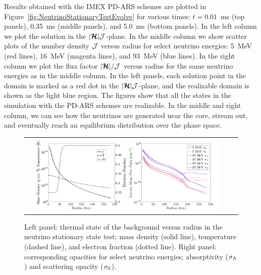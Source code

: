 Results obtained with the IMEX PD-ARS schemes are plotted in Figure~\ref{fig:NeutrinoStationaryTestEvolve} for various times: $t=0.01$~ms (top panels), 0.35~ms (middle panels), and 5.0~ms (bottom panels).  
In the left column we plot the solution in the $|\boldsymbol{\mathcal{H}}|\mathcal{J}$-plane.  
In the middle column we show scatter plots of the number density $\mathcal{J}$ versus radius for select neutrino energies: 5~MeV (red lines), 16~MeV (magenta lines), and $93$~MeV (blue lines).  
In the right column we plot the flux factor $|\boldsymbol{\mathcal{H}}|/\mathcal{J}$ versus radius for the same neutrino energies as in the middle column. 
In the left panels, each solution point in the domain is marked as a red dot in the $|\boldsymbol{\mathcal{H}}|\mathcal{J}$-plane, and the realizable domain is shown as the light blue region.  
The figures show that all the states in the simulation with the PD-ARS schemes are realizable.
In the middle and right column, we can see how the neutrinos are generated near the core, stream out, and eventually reach an equilibrium distribution over the phase space.

\begin{figure}[h]
  \centering
  \begin{tabular}{cc}
    \includegraphics[width=0.45\textwidth]{figures/NStatinaryS_EOS}
    \hspace{30pt}
    \includegraphics[width=0.45\textwidth]{figures/NSS_Opacities}
  \end{tabular}
   \caption{Left panel: thermal state of the background versus radius in the neutrino stationary state test; mass density (solid line), temperature (dashed line), and electron fraction (dotted line).  Right panel: corresponding opacities for select neutrino energies; absorptivity ($\sigma_{{\rm A}}$) and scattering opacity ($ \sigma_{{\rm S}}$).}
   \label{fig:NeutrinoStationaryTestEOS}
\end{figure}

